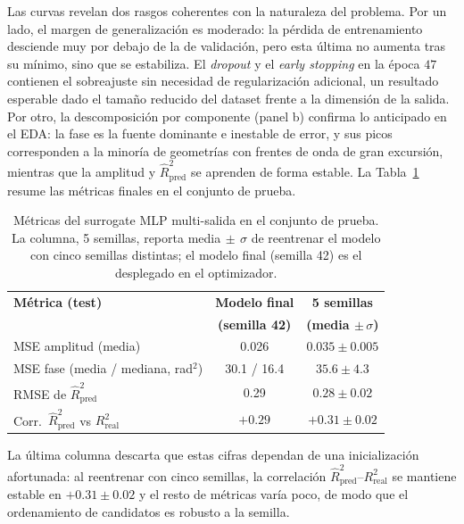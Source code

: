 Las curvas revelan dos rasgos coherentes con la naturaleza del problema. Por un lado, el margen de generalización es moderado: la pérdida de entrenamiento desciende muy por debajo de la de validación, pero esta última no aumenta tras su mínimo, sino que se estabiliza. El \textit{dropout} y el \textit{early stopping} en la época $47$ contienen el sobreajuste sin necesidad de regularización adicional, un resultado esperable dado el tamaño reducido del dataset frente a la dimensión de la salida. Por otro, la descomposición por componente (panel b) confirma lo anticipado en el EDA: la fase es la fuente dominante e inestable de error, y sus picos corresponden a la minoría de geometrías con frentes de onda de gran excursión, mientras que la amplitud y $\hat{R}^2_{\text{pred}}$ se aprenden de forma estable. La Tabla~\ref{tab:surrogate_metrics}
resume las métricas finales en el conjunto de prueba.

\begin{table}[H]
\centering
\small
\begin{tabular}{lcc}
\toprule
\textbf{Métrica (test)} & \textbf{Modelo final} & \textbf{5 semillas} \\
                        & \textbf{(semilla 42)} & \textbf{(media $\pm\,\sigma$)} \\
\midrule
MSE amplitud (media)                          & 0.026        & $0.035 \pm 0.005$ \\
MSE fase (media / mediana, rad$^2$)           & 30.1 / 16.4  & $35.6 \pm 4.3$ \\
RMSE de $\hat{R}^2_{\text{pred}}$             & 0.29         & $0.28 \pm 0.02$ \\
Corr.\ $\hat{R}^2_{\text{pred}}$ vs $R^2_{\text{real}}$ & $+0.29$ & $+0.31 \pm 0.02$ \\
\bottomrule
\end{tabular}
\caption{Métricas del surrogate MLP multi-salida en el conjunto de prueba. La columna, 5 semillas, reporta media$\,\pm\,\sigma$ de reentrenar el modelo con cinco semillas distintas; el modelo final (semilla 42) es el desplegado en el optimizador.}
\label{tab:surrogate_metrics}
\end{table}

La última columna descarta que estas cifras dependan de una inicialización afortunada: al reentrenar con cinco semillas, la correlación $\hat{R}^2_{\text{pred}}$--$R^2_{\text{real}}$ se mantiene estable en $+0.31 \pm 0.02$ y el resto de métricas varía poco, de modo que el ordenamiento de candidatos es robusto a la semilla.

